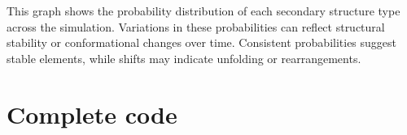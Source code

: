 \documentclass[a4paper,10pt,english]{sphinxmanual}
\begin{document}
\begin{sphinxVerbatim}[commandchars=\\\{\}]
  
\end{sphinxVerbatim}

\noindent{}

\sphinxAtStartPar
{} This graph shows the probability distribution of each secondary structure type across the simulation. Variations in these probabilities can reflect structural stability or conformational changes over time. Consistent probabilities suggest stable elements, while shifts may indicate unfolding or rearrangements.


\section{Complete code}
\label{\detokenize{SecondaryStructure:complete-code}}
\begin{sphinxVerbatim}[commandchars=\\\{\}]
 
\end{sphinxVerbatim}
\end{document}
